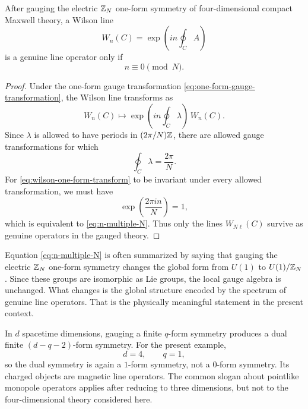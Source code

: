 \begin{proposition}\label{prop:maxwell-zn-selection}
After gauging the electric $\mathbb{Z}_N$ one-form symmetry of four-dimensional compact Maxwell theory, a Wilson line
\begin{equation}\label{eq:maxwell-wilson-n}
W_n(C)=\exp\!\left(i n\oint_C A\right)
\end{equation}
is a genuine line operator only if
\begin{equation}\label{eq:n-multiple-N}
n\equiv 0 \pmod N.
\end{equation}
\end{proposition}

\begin{proof}
Under the one-form gauge transformation \eqref{eq:one-form-gauge-transformation}, the Wilson line transforms as
\begin{equation}\label{eq:wilson-one-form-transform}
W_n(C)\longmapsto
\exp\!\left(i n\oint_C \lambda\right)\,W_n(C).
\end{equation}
Since $\lambda$ is allowed to have periods in $(2\pi/N)\mathbb{Z}$, there are allowed gauge transformations for which
\begin{equation*}
\oint_C \lambda = \frac{2\pi}{N}.
\end{equation*}
For \eqref{eq:wilson-one-form-transform} to be invariant under every allowed transformation, we must have
\begin{equation*}
\exp\!\left(\frac{2\pi i n}{N}\right)=1,
\end{equation*}
which is equivalent to \eqref{eq:n-multiple-N}. Thus only the lines $W_{N\ell}(C)$ survive as genuine operators in the gauged theory.
\end{proof}

\begin{remark}\label{rem:maxwell-global-form}
Equation \eqref{eq:n-multiple-N} is often summarized by saying that gauging the electric $\mathbb{Z}_N$ one-form symmetry changes the global form from $U(1)$ to $U(1)/\mathbb{Z}_N$. Since these groups are isomorphic as Lie groups, the local gauge algebra is unchanged. What changes is the global structure encoded by the spectrum of genuine line operators. That is the physically meaningful statement in the present context.
\end{remark}

\begin{remark}\label{rem:maxwell-dual-symmetry}
In $d$ spacetime dimensions, gauging a finite $q$-form symmetry produces a dual finite $(d-q-2)$-form symmetry. For the present example,
\begin{equation*}
d=4,
\qquad
q=1,
\end{equation*}
so the dual symmetry is again a $1$-form symmetry, not a $0$-form symmetry. Its charged objects are magnetic line operators. The common slogan about pointlike monopole operators applies after reducing to three dimensions, but not to the four-dimensional theory considered here.
\end{remark}

